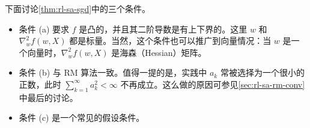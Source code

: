 下面讨论\cref{thm:rl-sa-sgd}中的三个条件。

\begin{itemize}
  \item 条件 (a) 要求 $f$ 是凸的，并且其二阶导数是有上下界的。这里 $w$ 和 $\nabla_w^2 f(w, X)$ 都是标量。当然，这个条件也可以推广到向量情况：当 $w$ 是一个向量时，$\nabla_w^2 f(w, X)$ 是海森（Hessian）矩阵。

  \item 条件 (b) 与 RM 算法一致。值得一提的是，实践中 $a_k$ 常被选择为一个很小的正数，此时 $\sum_{k=1}^{\infty} a_k^2 < \infty$ 不再成立。这么做的原因可参见\cref{sec:rl-sa-rm-conv}中最后的讨论。

  \item 条件 (c) 是一个常见的假设条件。
\end{itemize}


